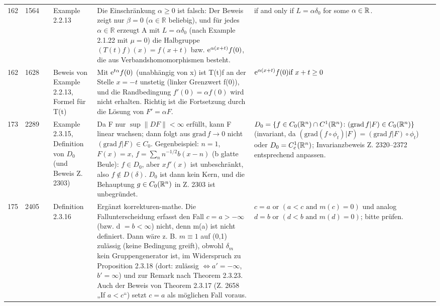 \documentclass[10pt]{article}
\begin{document}
\begin{longtable}{@{}rrc>{\RaggedRight\arraybackslash}p{3.0cm}>{\RaggedRight\arraybackslash}p{11.4cm}>{\RaggedRight\arraybackslash}p{7.4cm}@{}}
162 & 1564 & \sichA{} & Example 2.2.13 & Die Einschränkung $\ensuremath{\alpha} \ensuremath{\geq} 0$ ist falsch: Der Beweis zeigt nur $\ensuremath{\beta} = 0$ ($\ensuremath{\alpha} \ensuremath{\in} \ensuremath{\mathbb{R}}$ beliebig), und für jedes $\ensuremath{\alpha} \ensuremath{\in} \ensuremath{\mathbb{R}}$ erzeugt A mit $L = \alpha\delta_{0}$ (nach Example 2.1.22 mit $\ensuremath{\mu} = 0$) die Halbgruppe $(T(t)f)(x) = f(x+t)$ bzw. $\mathrm{e}^{\alpha(x+t)}f(0)$, die aus Verbandshomomorphismen besteht. & {if and only if\/ $L = \alpha\delta_{0}$ for some $\alpha \in \mathbb{R}$.} \\[2pt]
162 & 1628 & \sichA{} & Beweis von Example 2.2.13, Formel für T(t) & Mit $\mathrm{e}^{t\alpha}f(0)$ (unabhängig von x) ist T(t)f an der Stelle $x = \ensuremath{-}t$ unstetig (linker Grenzwert f(0)), und die Randbedingung $f'(0) = \alpha f(0)$ wird nicht erhalten. Richtig ist die Fortsetzung durch die Lösung von $F' = \alpha F$. & $\eu^{\alpha(x+t)}f(0)   \text{if } x+t \geq 0$ \\[2pt]
173 & 2289 & \sichA{} & Example 2.3.15, Definition von $D_0$ (und Beweis Z. 2303) & Da F nur $\sup\|DF\| < \infty$ erfüllt, kann F linear wachsen; dann folgt aus $\mathrm{grad}\, f \to 0$ nicht $(\mathrm{grad}\, f \vert F) \in C_{0}$. Gegenbeispiel: $n = 1$, $F(x) = x$, $f = \sum_{n} n^{-1/2}b(x-n)$ (b glatte Beule): $f \in D_{0}$, aber $xf'(x)$ ist unbeschränkt, also $f \notin D(\delta)$. $D_0$ ist dann kein Kern, und die Behauptung $g \in C_{0}(\mathbb{R}^{n})$ in Z. 2303 ist unbegründet. & $D_{0} = \{ f \in C_{0}(\mathbb{R}^{n}) \cap C^{1}(\mathbb{R}^{n}) \colon (\mathrm{grad}\, f \vert F) \in C_{0}(\mathbb{R}^{n}) \}$ (invariant, da $(\mathrm{grad}(f\circ\phi_{t})\vert F) = (\mathrm{grad}\, f\vert F)\circ\phi_{t}$) oder $D_{0} = C_{c}^{1}(\mathbb{R}^{n})$; Invarianzbeweis Z. 2320–2372 entsprechend anpassen. \\[2pt]
175 & 2405 & \sichB{} & Definition 2.3.16 & Ergänzt korrekturen-mathe. Die Fallunterscheidung erfasst den Fall $c = a > \ensuremath{-}\ensuremath{\infty}$ (bzw. d $= b < \ensuremath{\infty}$) nicht, denn m(a) ist nicht definiert. Dann wäre z. B. $m \ensuremath{\equiv} 1$ auf (0,1) zulässig (keine Bedingung greift), obwohl $\ensuremath{\delta}_m$ kein Gruppengenerator ist, im Widerspruch zu Proposition 2.3.18 (dort: zulässig $\ensuremath{\Leftrightarrow} a' = \ensuremath{-}\ensuremath{\infty}$, $b' = \ensuremath{\infty}$) und zur Remark nach Theorem 2.3.23. Auch der Beweis von Theorem 2.3.17 (Z. 2658 „If $a < c$“) setzt $c = a$ als möglichen Fall voraus. & $c = a \text{ or } (a < c \text{ and } m(c) = 0)$ und analog $d = b \text{ or } (d < b \text{ and } m(d) = 0)$; bitte prüfen. \\[2pt]

\end{longtable}
\end{document}

